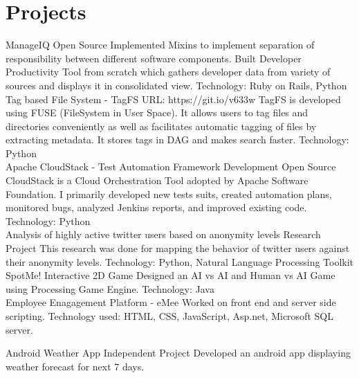 \documentclass[]{friggeri-cv}
\begin{document}
\section{Projects}
\begin{entrylist}
\entry
    {ManageIQ }
    {Open Source}
    {Implemented Mixins to implement separation of responsibility between different software components. Built Developer Productivity Tool from scratch which gathers developer data from variety of sources and displays it in consolidated view. Technology: Ruby on Rails, Python\\}
  \entry
    {Tag based File System - TagFS }
    {URL: https://git.io/v633w}
    {TagFS is developed using FUSE (FileSystem in User Space). It allows users to tag files and directories conveniently as well as facilitates automatic tagging of files by extracting metadata. It stores tags in DAG and makes search faster. Technology: Python\\}
    \entry
    {Apache CloudStack - Test Automation Framework Development }
    {Open Source}
    {CloudStack is a Cloud Orchestration Tool adopted by Apache Software Foundation. I primarily developed new tests suits, created automation plans, monitored bugs, analyzed Jenkins reports, and improved existing code. Technology: Python\\}
    \entry
    {Analysis of highly active twitter users based on anonymity levels}
    {Research Project}
    {This research was done for mapping the behavior of twitter users against their anonymity levels. Technology: Python, Natural Language Processing Toolkit\\}
    \entry
    {SpotMe! Interactive 2D Game}
    {}
    {Designed an AI vs AI and Human vs AI Game using Processing Game Engine. Technology: Java\\}
    \entry
    {Employee Enagagement Platform - eMee}
    {}
    {Worked on front end and server side scripting. Technology used: HTML, CSS, JavaScript, Asp.net, Microsoft SQL server.\\}
    
    \entry
    {Android Weather App}
    {Independent Project}
    {Developed an android app displaying weather forecast for next 7 days.\\}
\end{entrylist}
\end{document}
